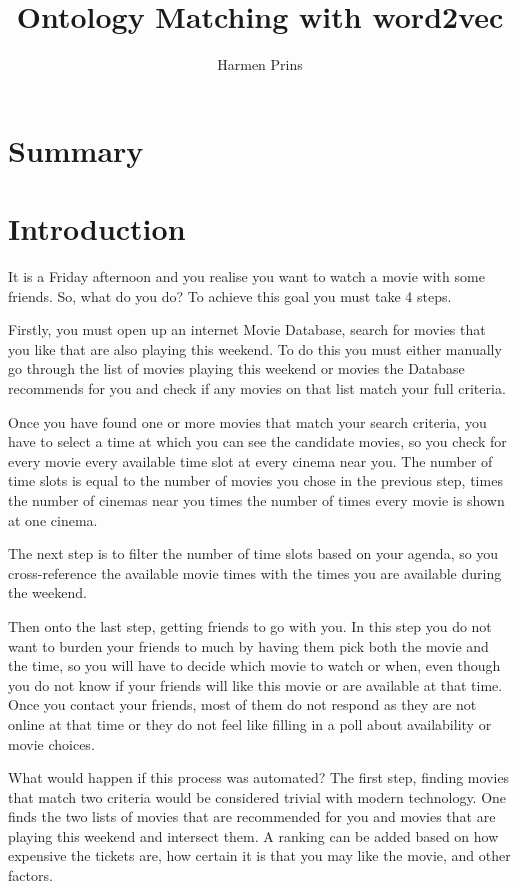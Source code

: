 \documentclass{article}
\title{Ontology Matching with word2vec}
\author{Harmen Prins}
\begin{document}
 \maketitle
 \newpage
 
 \section*{Summary}
 \tableofcontents
 \newpage
 
 \section{Introduction}
 It is a Friday afternoon and you realise you want to watch a movie with some friends. So, what do you do? To achieve this goal you must take 4 steps.
 
 Firstly, you must open up an internet Movie Database, search for movies that you like that are also playing this weekend. To do this you must either manually go through the list of movies playing this weekend or movies the Database recommends for you and check if any movies on that list match your full criteria.
 
 Once you have found one or more movies that match your search criteria, you have to select a time at which you can see the candidate movies, so you check for every movie every available time slot at every cinema near you. The number of time slots is equal to the number of movies you chose in the previous step, times the number of cinemas near you times the number of times every movie is shown at one cinema.
 
 The next step is to filter the number of time slots based on your agenda, so you cross-reference the available movie times with the times you are available during the weekend.
 
 Then onto the last step, getting friends to go with you. In this step you do not want to burden your friends to much by having them pick both the movie and the time, so you will have to decide which movie to watch or when, even though you do not know if your friends will like this movie or are available at that time. Once you contact your friends, most of them do not respond as they are not online at that time or they do not feel like filling in a poll about availability or movie choices.
 
 What would happen if this process was automated? The first step, finding movies that match two criteria would be considered trivial with modern technology. One finds the two lists of movies that are recommended for you and movies that are playing this weekend and intersect them. A ranking can be added based on how expensive the tickets are, how certain it is that you may like the movie, and other factors.
 
\end{document}
